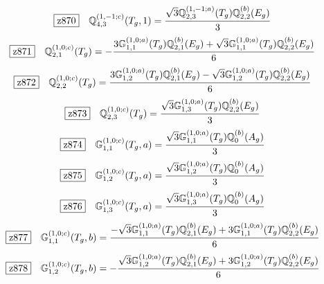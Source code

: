 \documentclass[fleqn,10pt,landscape]{jsarticle}
\begin{document}
\begin{dmath*}
\hspace*{3mm}\fbox{z870}\quad \mathbb{Q}_{4,3}^{(1,-1;c)}(T_{g},1)=\frac{\sqrt{3} \mathbb{Q}_{2,3}^{(1,-1;a)}(T_{g}) \mathbb{Q}_{2,2}^{(b)}(E_{g})}{3}
\end{dmath*}
\begin{dmath*}
\hspace*{3mm}\fbox{z871}\quad \mathbb{Q}_{2,1}^{(1,0;c)}(T_{g})=- \frac{3 \mathbb{G}_{1,1}^{(1,0;a)}(T_{g}) \mathbb{Q}_{2,1}^{(b)}(E_{g}) + \sqrt{3} \mathbb{G}_{1,1}^{(1,0;a)}(T_{g}) \mathbb{Q}_{2,2}^{(b)}(E_{g})}{6}
\end{dmath*}
\begin{dmath*}
\hspace*{3mm}\fbox{z872}\quad \mathbb{Q}_{2,2}^{(1,0;c)}(T_{g})=\frac{3 \mathbb{G}_{1,2}^{(1,0;a)}(T_{g}) \mathbb{Q}_{2,1}^{(b)}(E_{g}) - \sqrt{3} \mathbb{G}_{1,2}^{(1,0;a)}(T_{g}) \mathbb{Q}_{2,2}^{(b)}(E_{g})}{6}
\end{dmath*}
\begin{dmath*}
\hspace*{3mm}\fbox{z873}\quad \mathbb{Q}_{2,3}^{(1,0;c)}(T_{g})=\frac{\sqrt{3} \mathbb{G}_{1,3}^{(1,0;a)}(T_{g}) \mathbb{Q}_{2,2}^{(b)}(E_{g})}{3}
\end{dmath*}
\begin{dmath*}
\hspace*{3mm}\fbox{z874}\quad \mathbb{G}_{1,1}^{(1,0;c)}(T_{g},a)=\frac{\sqrt{3} \mathbb{G}_{1,1}^{(1,0;a)}(T_{g}) \mathbb{Q}_{0}^{(b)}(A_{g})}{3}
\end{dmath*}
\begin{dmath*}
\hspace*{3mm}\fbox{z875}\quad \mathbb{G}_{1,2}^{(1,0;c)}(T_{g},a)=\frac{\sqrt{3} \mathbb{G}_{1,2}^{(1,0;a)}(T_{g}) \mathbb{Q}_{0}^{(b)}(A_{g})}{3}
\end{dmath*}
\begin{dmath*}
\hspace*{3mm}\fbox{z876}\quad \mathbb{G}_{1,3}^{(1,0;c)}(T_{g},a)=\frac{\sqrt{3} \mathbb{G}_{1,3}^{(1,0;a)}(T_{g}) \mathbb{Q}_{0}^{(b)}(A_{g})}{3}
\end{dmath*}
\begin{dmath*}
\hspace*{3mm}\fbox{z877}\quad \mathbb{G}_{1,1}^{(1,0;c)}(T_{g},b)=\frac{- \sqrt{3} \mathbb{G}_{1,1}^{(1,0;a)}(T_{g}) \mathbb{Q}_{2,1}^{(b)}(E_{g}) + 3 \mathbb{G}_{1,1}^{(1,0;a)}(T_{g}) \mathbb{Q}_{2,2}^{(b)}(E_{g})}{6}
\end{dmath*}
\begin{dmath*}
\hspace*{3mm}\fbox{z878}\quad \mathbb{G}_{1,2}^{(1,0;c)}(T_{g},b)=- \frac{\sqrt{3} \mathbb{G}_{1,2}^{(1,0;a)}(T_{g}) \mathbb{Q}_{2,1}^{(b)}(E_{g}) + 3 \mathbb{G}_{1,2}^{(1,0;a)}(T_{g}) \mathbb{Q}_{2,2}^{(b)}(E_{g})}{6}
\end{dmath*}
\end{document}
